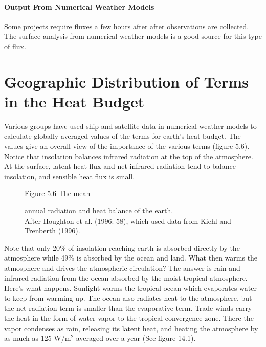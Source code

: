 \paragraph{Output From Numerical Weather Models}
Some projects require fluxes a few hours after after observations are
collected. The surface analysis from numerical
weather models is a good source for this type of flux.

\section[Geographic Distribution of Terms]{Geographic Distribution of Terms in
the Heat Budget} Various groups have used ship and satellite data in numerical
weather models to calculate globally averaged values of the terms for
earth's heat budget. The values give an overall view of the importance
of the various terms (figure 5.6).  Notice that
insolation balances infrared
radiation at the top of the atmosphere. At the surface, latent heat
flux and net infrared radiation tend to balance
insolation, and sensible heat
flux is small.

\begin{figure}[t!]
\centering
\footnotesize
Figure 5.6 The mean \rule{0mm}{4ex}annual radiation and heat balance
of the earth. \\After Houghton et al. (1996: 58), which used data from
Kiehl and Trenberth (1996).
\label{fig:heatbudget}
\vspace{-2ex}
\end{figure}

Note that only 20\% of insolation
reaching earth is absorbed directly by the atmosphere while 49\% is
absorbed by the ocean and land. What then warms the atmosphere and
drives the atmospheric circulation? The answer is rain and infrared
radiation from the ocean absorbed by the moist tropical
atmosphere. Here's what happens. Sunlight warms the tropical ocean
which evaporates water to keep from warming up. The ocean also
radiates heat to the atmosphere, but the net radiation term is smaller
than the evaporative term. Trade winds carry the heat in the form of
water vapor to the tropical convergence zone. There the vapor
condenses as rain, releasing its latent heat, and heating the
atmosphere by as much as 125 W/m$^2$ averaged over a year (See figure
14.1).

